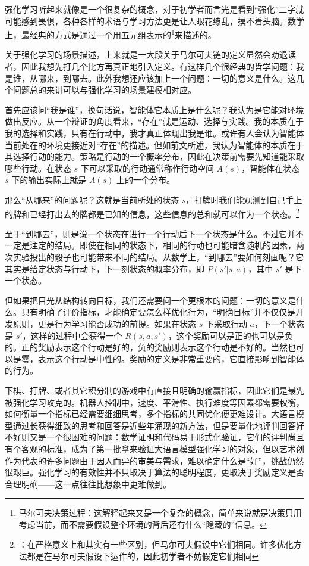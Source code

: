 强化学习听起来就像是一个很复杂的概念，对于初学者而言光是看到“强化”二字就可能感到畏惧，各种各样的术语与学习方法更是让人眼花缭乱，摸不着头脑。数学上，最经典的方式是通过一个用五元组表示的\footnote{马尔可夫决策过程：这解释起来又是一个复杂的概念，简单来说就是决策只用考虑当前，而不需要假设整个环境的背后还有什么“隐藏的”信息。}来描述的。

关于强化学习的场景描述，上来就是一大段关于马尔可夫链的定义显然会劝退读者，因此我想先打几个比方再真正地引入定义。有这样几个很经典的哲学问题：我是谁，从哪来，到哪去。此外我想还应该加上一个问题：一切的意义是什么。这几个问题总的来讲可以与强化学习的场景建模相对应。

首先应该问“我是谁”，换句话说，智能体它本质上是什么呢？我认为是它能对环境做出反应。从一个辩证的角度看来，“存在”就是运动、选择与实践。我的本质在于我的选择和实践，只有在行动中，我才真正体现出我是谁。或许有人会认为智能体当前处在的环境更接近对“存在”的描述。但如前文所述，我认为智能体的本质在于其选择行动的能力。策略是行动的一个概率分布，因此在决策前需要先知道能采取哪些行动。在状态 $s$ 下可以采取的行动通常称作行动空间 $A(s)$，智能体在状态 $s$ 下的输出实际上就是 $A(s)$ 上的一个分布。

那么“从哪来”的问题呢？这就是当前所处的状态 $s$，打牌时我们能观测到自己手上的牌和已经打出去的牌都是已知的信息，这些信息的总和就可以作为一个状态。\footnote{：在严格意义上和其实有一些区别，但马尔可夫假设中它们相同。许多优化方法都是在马尔可夫假设下运作的，因此初学者不妨假定它们相同}

至于“到哪去”，则是说一个状态在进行一个行动后下一个状态是什么。不过它并不一定是注定的结局。即使在相同的状态下，相同的行动也可能暗含随机的因素，两次实验投出的骰子也可能带来不同的结局。从数学上，“到哪去”要如何刻画呢？它其实是给定状态与行动下，下一刻状态的概率分布，即 $P(s'|s,a)$，其中 $s'$ 是下一个状态。

但如果把目光从结构转向目标，我们还需要问一个更根本的问题：一切的意义是什么。只有明确了评价指标，才能确定要怎么样优化行为，“明确目标”并不仅仅是开发原则，更是行为学习能否成功的前提。如果在状态 $s$ 下采取行动 $a$，下一个状态是 $s'$，这样的过程中会获得一个 $R(s,a,s')$，这个奖励可以是正的也可以是负的。正的奖励表示这个行动是好的，负的奖励则表示这个行动是不好的。当然也可以是零，表示这个行动是中性的。奖励的定义是非常重要的，它直接影响到智能体的行为。

下棋、打牌、或者其它积分制的游戏中有直接且明确的输赢指标，因此它们是最先被强化学习攻克的。机器人控制中，速度、平滑性、执行难度等因素都需要权衡，如何衡量一个指标已经需要细细思考，多个指标的共同优化便更难设计。大语言模型通过长获得细致的思考和回答是近些年涌现的新方法，但是要量化地评判回答好不好则又是一个很困难的问题：数学证明和代码易于形式化验证，它们的评判尚且有个客观的标准，成为了第一批拿来验证大语言模型强化学习的对象，但以艺术创作为代表的许多问题由于因人而异的审美与需求，难以确定什么是“好”，挑战仍然很艰巨。强化学习的有效性并不只取决于算法的聪明程度，更取决于奖励定义是否合理明确——这一点往往比想象中更难做到。


